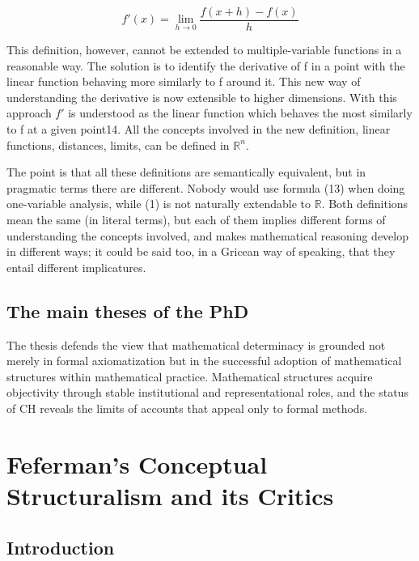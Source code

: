 \documentclass[11pt,a4paper]{book}
\theoremstyle{plain}
\begin{document}
$$ f'(x)=\lim_{h\to 0}\frac{f(x+h)-f(x)}{h} $$
 
This definition, however, cannot be extended to multiple-variable functions in a reasonable way. The solution is to identify the derivative of f in a point with the linear function behaving more similarly to f around it. This new way of understanding the derivative is now extensible to higher dimensions. With this approach $f'$ is understood as the linear function which behaves the most similarly to f at a given point14. All the concepts involved in the new definition, linear functions, distances, limits, can be defined in $\mathbb{R}^n$.

The point is that all these definitions are semantically equivalent, but in pragmatic terms there are different. Nobody would use formula (13) when doing one-variable analysis, while (1) is not naturally extendable to $\mathbb{R}$. Both definitions mean the same (in literal terms), but each of them implies different forms of understanding the concepts involved, and makes mathematical reasoning develop in different ways; it could be said too, in a Gricean way of speaking, that they entail different implicatures.



\section{The main theses of the PhD}
The thesis defends the view that mathematical determinacy is grounded not merely in formal axiomatization but in the successful adoption of mathematical structures within mathematical practice. Mathematical structures acquire objectivity through stable institutional and representational roles, and the status of CH reveals the limits of accounts that appeal only to formal methods.

\chapter{Feferman's Conceptual Structuralism and its Critics}
\label{chapter1}

\section{Introduction}
\label{Intro-Chapter-1}
\end{document}
